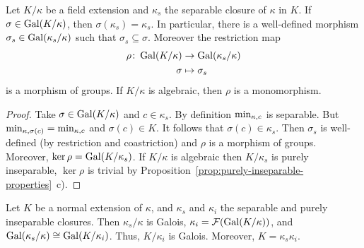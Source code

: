 \begin{cor}\label{cor:separable-closure-restriction}
    Let\/ $K/\kappa$ be a field extension and\/ $\kappa_s$ the separable closure of\/ $\kappa$ in\/ $K$. If\/ $\sigma\in\operatorname{Gal}(K/\kappa)$, then\/ $\sigma(\kappa_s)=\kappa_s$. In particular, there is a well-defined morphism\/ $\sigma_s\in\operatorname{Gal}(\kappa_s/\kappa)$ such that\/ $\sigma_s\subseteq\sigma$. Moreover the restriction map
    \begin{align*}
        \rho\colon\operatorname{Gal}(K/\kappa)&\to\operatorname{Gal}(\kappa_s/\kappa)\\
        \sigma&\mapsto\sigma_s
    \end{align*}
    is a morphism of groups. If $K/\kappa$ is algebraic, then $\rho$ is a monomorphism.
\end{cor}

\begin{proof}
    Take $\sigma\in\operatorname{Gal}(K/\kappa)$ and $c\in\kappa_s$. By definition $\operatorname{min}_{\kappa,c}$ is separable. But $\operatorname{min}_{\kappa,\sigma(c)}=\operatorname{min}_{\kappa,c}$ and $\sigma(c)\in K$. It follows that $\sigma(c)\in\kappa_s$. Then $\sigma_s$ is well-defined (by restriction and coastriction) and $\rho$ is a morphism of groups. Moreover, $\ker\rho=\operatorname{Gal}(K/\kappa_s)$. If $K/\kappa$ is algebraic then $K/\kappa_s$ is purely inseparable, $\ker\rho$ is trivial by Proposition~\ref{prop:purely-inseparable-properties}~c).
\end{proof}

\begin{thm}\label{thm:sep-and-p.insep-galois}
    Let\/ $K$ be a normal extension of\/ $\kappa$, and\/ $\kappa_s$ and\/ $\kappa_i$ the separable and purely inseparable closures. Then\/ $\kappa_s / \kappa$ is Galois, $\kappa_i = \mathcal F(\operatorname{Gal}(K / \kappa))$, and\/ $\operatorname{Gal}(\kappa_s / \kappa) \cong \operatorname{Gal}(K / \kappa_i)$. Thus, $K / \kappa_i$ is Galois. Moreover, $K = \kappa_s \kappa_i$.
\end{thm}

